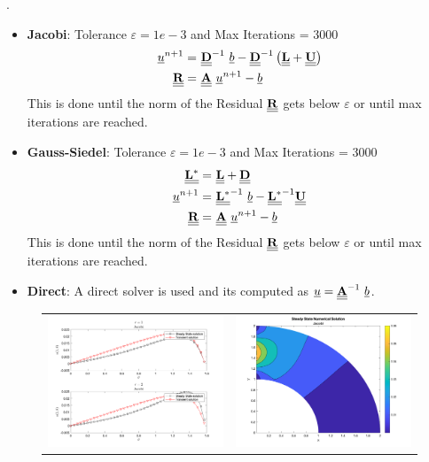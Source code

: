 \documentclass[11pt]{article}
\newcommand{\bra}[1]{\left(#1\right)}
\newcommand{\matA}[1]{{\bf \underline{\underline{#1}}}}
\begin{document}
\begin{enumerate}
\begin{enumerate}
    .
    \begin{itemize}
        \item {\bf Jacobi}: Tolerance $\varepsilon = 1e-3 $ and Max Iterations = 3000 
        \begin{align*}
            \underline{u}^{n+1} =& \ \matA{D}^{-1} \ \underline{b} - \matA{D}^{-1}\bra{\matA{L}+\matA{U}} \\
            \matA{R} =& \ \matA{A}\ \underline{u}^{n+1}- \underline{b}
        \end{align*}
        This is done until the norm of the Residual $\matA{R}$ gets below $\varepsilon$ or until max iterations are reached.
        \item {\bf Gauss-Siedel}: Tolerance $\varepsilon = 1e-3 $ and Max Iterations = 3000 
        \begin{align*}
            \matA{L^{*}} =& \ \matA{L} + \matA{D}\\
            \underline{u}^{n+1} =& \ \matA{L^{*}}^{-1} \ \underline{b} - \matA{L^{*}}^{-1}\matA{U} \\
            \matA{R} =& \ \matA{A}\ \underline{u}^{n+1}- \underline{b}
        \end{align*}
        This is done until the norm of the Residual $\matA{R}$ gets below $\varepsilon$ or until max iterations are reached.
        \item {\bf Direct}: A direct solver is used and its computed as $\underline{u} = \matA{A}^{-1}\ \underline{b}$.
    \end{itemize}
    \begin{figure}[htp]
        \centering
        \begin{tabular}{cc}
            \includegraphics[width=3.5in]{p11} & \includegraphics[width=3.5in]{p21} \\ 

\end{tabular}
\end{figure}
\end{enumerate}
\end{enumerate}
\end{document}
